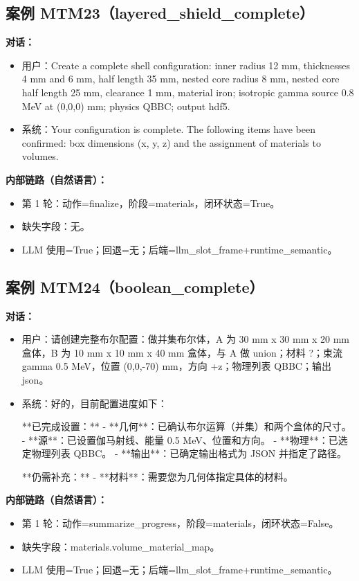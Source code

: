 \documentclass[11pt]{ctexart}
\begin{document}
\subsection{案例 MTM23（layered\_shield\_complete）}
\textbf{对话：}
\begin{itemize}
\item 用户：Create a complete shell configuration: inner radius 12 mm, thicknesses 4 mm and 6 mm, half length 35 mm, nested core radius 8 mm, nested core half length 25 mm, clearance 1 mm, material iron; isotropic gamma source 0.8 MeV at (0,0,0) mm; physics QBBC; output hdf5.
\item 系统：Your configuration is complete. The following items have been confirmed: box dimensions (x, y, z) and the assignment of materials to volumes.
\end{itemize}
\textbf{内部链路（自然语言）：}
\begin{itemize}
\item 第 1 轮：动作=finalize，阶段=materials，闭环状态=True。
\item 缺失字段：无。
\item LLM 使用=True；回退=无；后端=llm\_slot\_frame+runtime\_semantic。
\end{itemize}
\subsection{案例 MTM24（boolean\_complete）}
\textbf{对话：}
\begin{itemize}
\item 用户：请创建完整布尔配置：做并集布尔体，A 为 30 mm x 30 mm x 20 mm 盒体，B 为 10 mm x 10 mm x 40 mm 盒体，与 A 做 union；材料 ?；束流 gamma 0.5 MeV，位置 (0,0,-70) mm，方向 +z；物理列表 QBBC；输出 json。
\item 系统：好的，目前配置进度如下：

**已完成设置：**
- **几何**：已确认布尔运算（并集）和两个盒体的尺寸。
- **源**：已设置伽马射线、能量 0.5 MeV、位置和方向。
- **物理**：已选定物理列表 QBBC。
- **输出**：已确定输出格式为 JSON 并指定了路径。

**仍需补充：**
- **材料**：需要您为几何体指定具体的材料。
\end{itemize}
\textbf{内部链路（自然语言）：}
\begin{itemize}
\item 第 1 轮：动作=summarize\_progress，阶段=materials，闭环状态=False。
\item 缺失字段：materials.volume\_material\_map。
\item LLM 使用=True；回退=无；后端=llm\_slot\_frame+runtime\_semantic。
\end{itemize}
\end{document}
